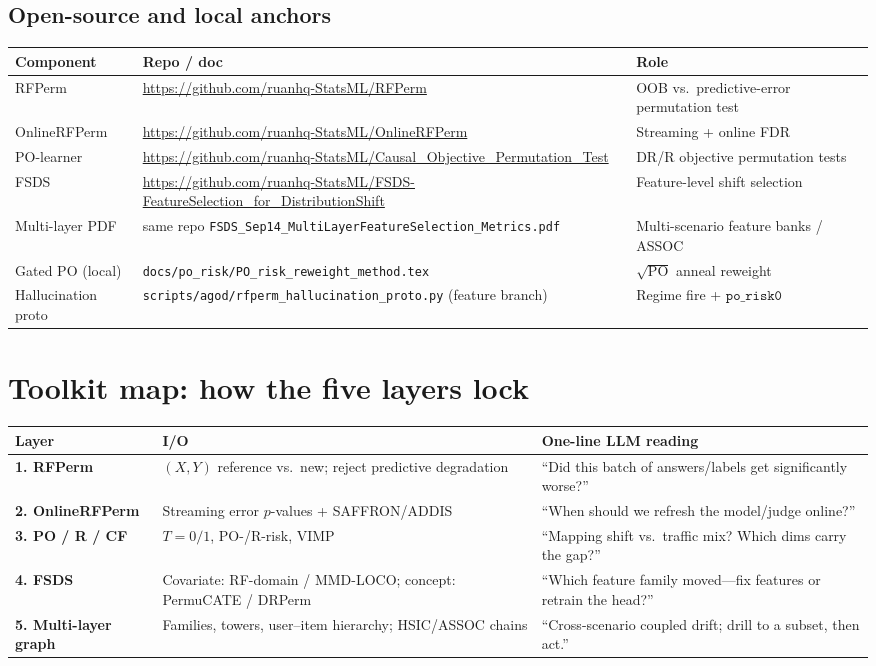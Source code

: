 \documentclass[11pt,a4paper]{article}
\begin{document}
\subsection{Open-source and local anchors}
\begin{center}
\begin{tabular}{@{}llp{7.0cm}@{}}
\toprule
Component & Repo / doc & Role \\
\midrule
RFPerm & \url{https://github.com/ruanhq-StatsML/RFPerm} & OOB vs.\ predictive-error permutation test \\
OnlineRFPerm & \url{https://github.com/ruanhq-StatsML/OnlineRFPerm} & Streaming + online FDR \\
PO-learner & \url{https://github.com/ruanhq-StatsML/Causal_Objective_Permutation_Test} & DR/R objective permutation tests \\
FSDS & \url{https://github.com/ruanhq-StatsML/FSDS-FeatureSelection_for_DistributionShift} & Feature-level shift selection \\
Multi-layer PDF & same repo \texttt{FSDS\_Sep14\_MultiLayerFeatureSelection\_Metrics.pdf} & Multi-scenario feature banks / ASSOC \\
Gated PO (local) & \texttt{docs/po\_risk/PO\_risk\_reweight\_method.tex} & \(\sqrt{\mathrm{PO}}\) anneal reweight \\
Hallucination proto & \texttt{scripts/agod/rfperm\_hallucination\_proto.py} (feature branch) & Regime fire + \(\texttt{po\_risk0}\) \\
\bottomrule
\end{tabular}
\end{center}

\section{Toolkit map: how the five layers lock}
\label{sec:toolkit}

\begin{center}
\begin{tabular}{@{}p{2.6cm}p{4.0cm}p{5.6cm}@{}}
\toprule
Layer & I/O & One-line LLM reading \\
\midrule
\textbf{1. RFPerm} &
\((X,Y)\) reference vs.\ new; reject predictive degradation &
``Did this batch of answers/labels get significantly worse?'' \\
\textbf{2. OnlineRFPerm} &
Streaming error \(p\)-values + SAFFRON/ADDIS &
``When should we refresh the model/judge online?'' \\
\textbf{3. PO / R / CF} &
\(T=0/1\), PO-/R-risk, VIMP &
``Mapping shift vs.\ traffic mix? Which dims carry the gap?'' \\
\textbf{4. FSDS} &
Covariate: RF-domain / MMD-LOCO; concept: PermuCATE / DRPerm &
``Which feature family moved---fix features or retrain the head?'' \\
\textbf{5. Multi-layer graph} &
Families, towers, user--item hierarchy; HSIC/ASSOC chains &
``Cross-scenario coupled drift; drill to a subset, then act.'' \\
\bottomrule
\end{tabular}
\end{center}
\end{document}
